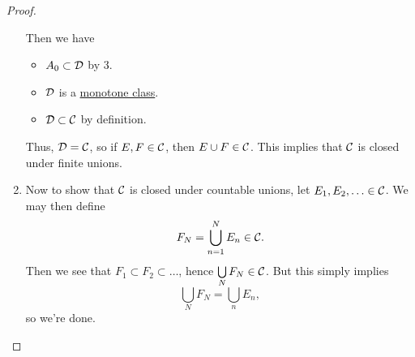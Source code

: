 \begin{proof}
\begin{enumerate}
		      Then we have
		      \begin{itemize}
			      \item \(A_0\subset \mathcal{\MakeUppercase{d}} \) by 3.
			      \item \(\mathcal{\MakeUppercase{d}} \) is a \hyperref[def:monotone-class]{monotone class}.
			      \item \(\mathcal{\MakeUppercase{D}} \subset \mathcal{\MakeUppercase{C}} \) by definition.
		      \end{itemize}
		      Thus, \(\mathcal{\MakeUppercase{d}}  = \mathcal{\MakeUppercase{C}} \), so if \(E, F\in \mathcal{\MakeUppercase{C}} \), then \(E\cup F\in \mathcal{\MakeUppercase{C}} \). This implies that \(\mathcal{\MakeUppercase{C}} \)
		      is closed under finite unions.
		\item Now to show that \(\mathcal{\MakeUppercase{C}}\) is closed under countable unions, let \(E_1, E_2, \ldots \in \mathcal{\MakeUppercase{C}}  \). We may then define
		      \[
			      F_{N} = \bigcup\limits_{n=1}^{N} E_{n} \in \mathcal{\MakeUppercase{C}} .
		      \]
		      Then we see that \(F_1\subset F_2\subset \ldots  \), hence \(\bigcup\limits_{N} F_{N} \in \mathcal{\MakeUppercase{C}}\). But this simply implies
		      \[
			      \bigcup\limits_{N}F_{N} = \bigcup\limits_{n}E_{n} ,
		      \]
		      so we're done.
	\end{enumerate}
\end{proof}